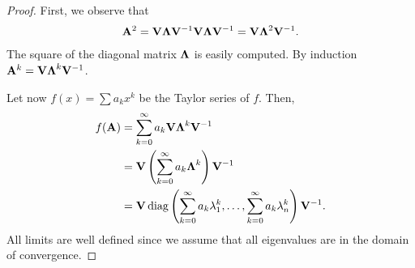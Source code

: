 \begin{proof}
  First, we observe that
  \begin{gather}
    \mathbf A^2 = \mathbf V \boldsymbol\Lambda \mathbf V^{-1} \mathbf V \boldsymbol\Lambda \mathbf V^{-1}
    = \mathbf V \boldsymbol\Lambda^2 \mathbf V^{-1}.
  \end{gather}
  The square of the diagonal matrix $\boldsymbol\Lambda$ is easily computed.
  By induction $\mathbf A^k =  \mathbf V \boldsymbol\Lambda^k \mathbf V^{-1}$.

  Let now $f(x) = \sum a_k x^k$ be the Taylor series of $f$. Then,
  \begin{gather}
    \begin{split}
      f(\mathbf A)
      &= \sum_{k=0}^\infty a_k  \mathbf V \boldsymbol\Lambda^k \mathbf V^{-1}\\
      &= \mathbf V \left(\sum_{k=0}^\infty a_k \boldsymbol\Lambda^k\right) \mathbf V^{-1}\\
      &= \mathbf V \operatorname{diag}\left(
        \sum_{k=0}^\infty a_k \lambda_1^k,\dots,
        \sum_{k=0}^\infty a_k\lambda_n^k
      \right)  \mathbf V^{-1}.
    \end{split}
  \end{gather}
  All limits are well defined since we assume that all eigenvalues are
  in the domain of convergence.
\end{proof}

